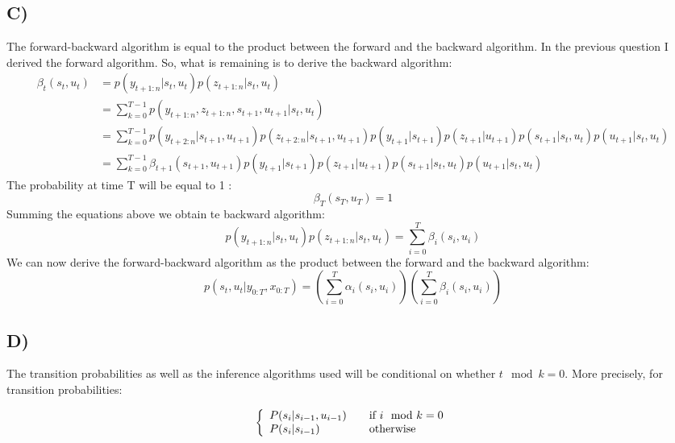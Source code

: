 \documentclass{report}
\begin{document}
\subsection*{C)}
The forward-backward algorithm is equal to the product between the forward and the
backward algorithm. In the previous question I derived the forward algorithm. So,
what is remaining is to derive the backward algorithm:
\begin{equation}
  \begin{aligned}
    \beta_t(s_t, u_t) & = p(y_{t+1:n} | s_t, u_t) p(z_{t+1:n} | s_t, u_t)\\
    & = \sum_{k=0}^{T-1} p(y_{t+1:n}, z_{t+1:n}, s_{t+1}, u_{t+1} | s_t, u_t)\\
    & = \sum_{k=0}^{T-1} p(y_{t+2:n} | s_{t+1}, u_{t+1}) p(z_{t+2:n} | s_{t+1}, u_{t+1}) p(y_{t+1} | s_{t+1}) p(z_{t+1} | u_{t+1}) p(s_{t+1} | s_t, u_t) p(u_{t+1} | s_t, u_t)\\
    & = \sum_{k=0}^{T-1} \beta_{t+1}(s_{t+1}, u_{t+1}) p(y_{t+1} | s_{t+1}) p(z_{t+1} | u_{t+1}) p(s_{t+1} | s_t, u_t) p(u_{t+1} | s_t, u_t)
  \end{aligned}
\end{equation}
The probability at time T will be equal to 1 :
\begin{equation}
  \beta_T (s_T, u_T) = 1
\end{equation}
Summing the equations above we obtain te backward algorithm:
\begin{equation}
p(y_{t+1:n} | s_t, u_t) p(z_{t+1:n} | s_t, u_t) = \sum_{i=0}^{T} \beta_i(s_i, u_i)
\end{equation}
We can now derive the forward-backward algorithm as the product between the forward
and the backward algorithm:
\begin{equation}
p(s_t, u_t | y_{0:T}, x_{0:T}) = \left(\sum_{i=0}^T \alpha_i(s_i, u_i)\right)\left( \sum_{i=0}^{T} \beta_i(s_i, u_i)\right)
\end{equation}

\subsection*{D)}
The transition probabilities as well as the inference algorithms used will be
conditional on whether $t\mod{k}=0$. More precisely, for transition probabilities:

\begin{equation}
  \left\{
  \begin{array}{l l}
    P(s_i | s_{i-1}, u_{i-1}) & \quad \text{if } i \mod k = 0 \\
    P(s_i | s_{i-1}) & \quad \text{otherwise}

  \end{array} \right.
\end{equation}
\end{document}
